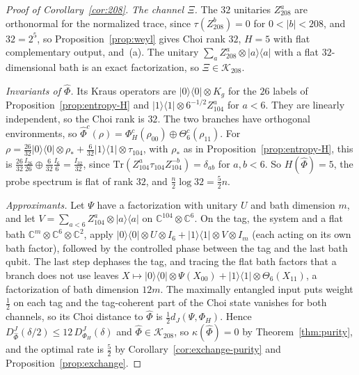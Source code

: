 \documentclass[11pt,a4paper]{article}
\theoremstyle{plain}
\theoremstyle{definition}
\theoremstyle{remark}
\newcommand{\DChoi}{D^{J}}
\newcommand{\dJ}{d_J}
\begin{document}
\begin{proof}[Proof of Corollary~\ref{cor:208}]
\emph{The channel $\Xi$.} The $32$ unitaries $Z_{208}^a$ are orthonormal for the normalized trace, since $\tau(Z_{208}^b)=0$ for $0<|b|<208$, and
$32=2^5$, so Proposition~\ref{prop:weyl} gives Choi rank $32$, $H=5$ with flat complementary output, and~(a). The unitary $\sum_aZ_{208}^a\otimes|a\rangle\langle a|$
with a flat $32$-dimensional bath is an exact factorization, so $\Xi\in\mathcal K_{208}$.

\emph{Invariants of $\widehat\Phi$.} Its Kraus operators are $|0\rangle\langle0|\otimes K_g$ for the $26$ labels of Proposition~\ref{prop:entropy-H} and
$|1\rangle\langle1|\otimes6^{-1/2}Z_{104}^a$ for $a<6$. They are linearly independent, so the Choi rank is $32$. The two branches have orthogonal
environments, so $\widehat\Phi^c(\rho)=\Phi_H^c(\rho_{00})\oplus\Theta_6^c(\rho_{11})$. For $\rho=\frac{26}{32}|0\rangle\langle0|\otimes\rho_*+\frac6{32}|1\rangle\langle1|\otimes\tau_{104}$,
with $\rho_*$ as in Proposition~\ref{prop:entropy-H}, this is $\frac{26}{32}\frac{I_{26}}{26}\oplus\frac6{32}\frac{I_6}6=\frac{I_{32}}{32}$, since
$\mathrm{Tr}(Z_{104}^a\tau_{104}Z_{104}^{-b})=\delta_{ab}$ for $a,b<6$. So $H(\widehat\Phi)=5$, the probe spectrum is flat of rank $32$, and $\frac n2\log32=\frac52n$.

\emph{Approximants.} Let $\Psi$ have a factorization with unitary $U$ and bath dimension $m$, and let $V=\sum_{a<6}Z_{104}^a\otimes|a\rangle\langle a|$ on
$\mathbb C^{104}\otimes\mathbb C^6$. On the tag, the system and a flat bath $\mathbb C^m\otimes\mathbb C^6\otimes\mathbb C^2$, apply
$|0\rangle\langle0|\otimes U\otimes I_6+|1\rangle\langle1|\otimes V\otimes I_m$ (each acting on its own bath factor), followed by the controlled phase between the tag
and the last bath qubit. The last step dephases the tag, and tracing the flat bath factors that a branch does not use leaves
$X\mapsto|0\rangle\langle0|\otimes\Psi(X_{00})+|1\rangle\langle1|\otimes\Theta_6(X_{11})$, a factorization of bath dimension $12m$. The maximally entangled input
puts weight $\frac12$ on each tag and the tag-coherent part of the Choi state vanishes for both channels, so its Choi distance to $\widehat\Phi$ is
$\frac12\dJ(\Psi,\Phi_H)$. Hence $\DChoi_{\widehat\Phi}(\delta/2)\le12\,\DChoi_{\Phi_H}(\delta)$ and $\widehat\Phi\in\mathcal K_{208}$, so $\kappa(\widehat\Phi)=0$ by
Theorem~\ref{thm:purity}, and the optimal rate is $\frac52$ by Corollary~\ref{cor:exchange-purity} and Proposition~\ref{prop:exchange}.


\end{proof}
\end{document}
